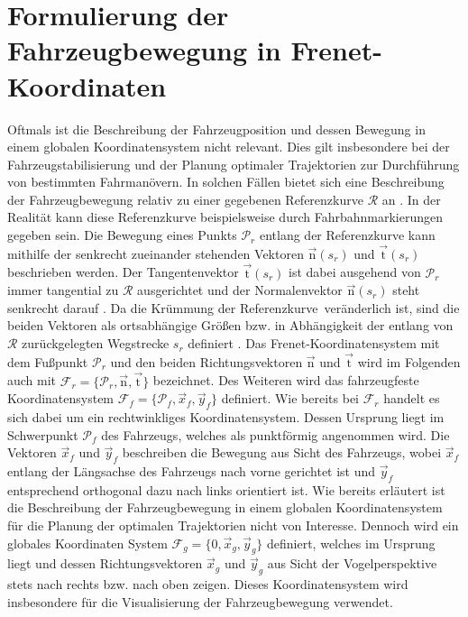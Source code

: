 \section{Formulierung der Fahrzeugbewegung in Frenet-Koordinaten}\label{sec:Frenet_KS}
Oftmals ist die Beschreibung der Fahrzeugposition und dessen Bewegung in einem globalen Koordinatensystem nicht relevant. Dies gilt insbesondere bei der Fahrzeugstabilisierung und der Planung optimaler Trajektorien zur Durchführung von bestimmten Fahrmanövern. In solchen Fällen bietet sich eine Beschreibung der Fahrzeugbewegung relativ zu einer gegebenen Referenzkurve $\mathcal{R}$ an \cite{Rathgeber.2016}. In der Realität kann diese Referenzkurve beispielsweise durch Fahrbahnmarkierungen gegeben sein. Die Bewegung eines Punkts $\mathcal{P}_r$ entlang der Referenzkurve kann mithilfe der senkrecht zueinander stehenden Vektoren $\vec{\textrm{n}}(s_r)$ und $\vec{\textrm{t}}(s_r)$ beschrieben werden. Der Tangentenvektor $\vec{\textrm{t}}(s_r)$ ist dabei ausgehend von $\mathcal{P}_r$ immer tangential zu $\mathcal{R}$ ausgerichtet und der Normalenvektor $\vec{\textrm{n}}(s_r)$ steht senkrecht darauf \cite{Rathgeber.2016}. Da die Krümmung der Referenzkurve \kapparefofs\,veränderlich ist, sind die beiden Vektoren als ortsabhängige Größen bzw. in Abhängigkeit der entlang von $\mathcal{R}$ zurückgelegten Wegstrecke $s_r$ definiert \cite{Werling.2011}. Das Frenet-Koordinatensystem mit dem Fußpunkt $\mathcal{P}_r$ und den beiden Richtungsvektoren $\vec{\textrm{n}}$ und $\vec{\textrm{t}}$ wird im Folgenden auch mit $\mathcal{F}_r = \{\mathcal{P}_r, \vec{\textrm{n}}, \vec{\textrm{t}}\}$ bezeichnet. Des Weiteren wird das fahrzeugfeste Koordinatensystem $\mathcal{F}_f = \{\mathcal{P}_f, \vec{x}_f, \vec{y}_f\}$ definiert. Wie bereits bei $\mathcal{F}_r$ handelt es sich dabei um ein rechtwinkliges Koordinatensystem. Dessen Ursprung liegt im Schwerpunkt $\mathcal{P}_f$ des Fahrzeugs, welches als punktförmig angenommen wird. Die Vektoren $\vec{x}_f$ und $\vec{y}_f$ beschreiben die Bewegung aus Sicht des Fahrzeugs, wobei $\vec{x}_f$ entlang der Längsachse des Fahrzeugs nach vorne gerichtet ist und $\vec{y}_f$ entsprechend orthogonal dazu nach links orientiert ist. Wie bereits erläutert ist die Beschreibung der Fahrzeugbewegung in einem globalen Koordinatensystem für die Planung der optimalen Trajektorien nicht von Interesse. Dennoch wird ein globales Koordinaten System $\mathcal{F}_g = \{0, \vec{x}_g, \vec{y}_g\}$ definiert, welches im Ursprung liegt und dessen Richtungsvektoren $\vec{x}_g$ und $\vec{y}_g$ aus Sicht der Vogelperspektive stets nach rechts bzw. nach oben zeigen. Dieses Koordinatensystem wird insbesondere für die Visualisierung der Fahrzeugbewegung verwendet.


